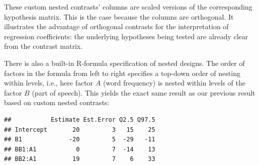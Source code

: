 \documentclass[12pt,]{krantz}
\newenvironment{Shaded}{\begin{snugshade}}{\end{snugshade}}
\newcommand{\KeywordTok}[1]{\textcolor[rgb]{0.13,0.29,0.53}{\textbf{#1}}}
\newcommand{\DataTypeTok}[1]{\textcolor[rgb]{0.13,0.29,0.53}{#1}}
\newcommand{\DecValTok}[1]{\textcolor[rgb]{0.00,0.00,0.81}{#1}}
\newcommand{\FloatTok}[1]{\textcolor[rgb]{0.00,0.00,0.81}{#1}}
\newcommand{\StringTok}[1]{\textcolor[rgb]{0.31,0.60,0.02}{#1}}
\newcommand{\OperatorTok}[1]{\textcolor[rgb]{0.81,0.36,0.00}{\textbf{#1}}}
\newcommand{\NormalTok}[1]{#1}
\theoremstyle{definition}
\theoremstyle{definition}
\theoremstyle{definition}
\theoremstyle{remark}
\begin{document}
These custom nested contrasts' columns are scaled versions of the
corresponding hypothesis matrix. This is the case because the columns
are orthogonal. It illustrates the advantage of orthogonal contrasts for
the interpretation of regression coefficients: the underlying hypotheses
being tested are already clear from the contrast matrix.

There is also a built-in R-formula specification of nested designs. The
order of factors in the formula from left to right specifies a top-down
order of nesting within levels, i.e., here factor \(A\) (word frequency)
is nested within levels of the factor \(B\) (part of speech). This
yields the exact same result as our previous result based on custom
nested contrasts:

\begin{Shaded}
\end{Shaded}

\begin{verbatim}
##           Estimate Est.Error Q2.5 Q97.5
## Intercept       20         3   15    25
## B1             -20         5  -29   -11
## BB1:A1           0         7  -14    13
## BB2:A1          19         7    6    33
\end{verbatim}
\end{document}
